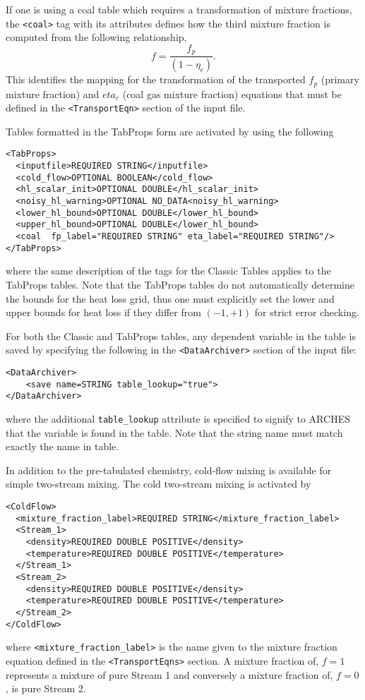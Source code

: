 If one is using a coal table which requires a transformation of mixture fractions, the \verb=<coal>= tag with its attributes defines how the third mixture fraction is computed from the following relationship, 
\begin{equation}
f = \frac{ f_p }{(1 - \eta_c) }.
\end{equation}   
This identifies the mapping for the transformation of the transported $f_p$ (primary mixture fraction) and  $eta_c$ (coal gas mixture fraction) equations that must be defined in the \verb=<TransportEqn>= section of the input file.  

Tables formatted in the TabProps form are activated by using the following
%
\begin{Verbatim}[fontsize=\footnotesize]
<TabProps>
  <inputfile>REQUIRED STRING</inputfile> 
  <cold_flow>OPTIONAL BOOLEAN</cold_flow>
  <hl_scalar_init>OPTIONAL DOUBLE</hl_scalar_init> 
  <noisy_hl_warning>OPTIONAL NO_DATA<noisy_hl_warning> 
  <lower_hl_bound>OPTIONAL DOUBLE</lower_hl_bound>
  <upper_hl_bound>OPTIONAL DOUBLE</lower_hl_bound>
  <coal  fp_label="REQUIRED STRING" eta_label="REQUIRED STRING"/> 
</TabProps>
\end{Verbatim}
%
where the same description of the tags for the Classic Tables applies to the TabProps tables.  Note that the TabProps tables do not automatically determine the bounds for the heat loss grid, thus one must explicitly set the lower and upper bounds for heat loss if they differ from $(-1, +1)$ for strict error checking.  

For both the Classic and TabProps tables, any dependent variable in the table is saved by specifying the following in the \verb=<DataArchiver>= section of the input file: 
%
\begin{Verbatim}[fontsize=\footnotesize]
<DataArchiver>
    <save name=STRING table_lookup="true"> 
</DataArchiver>
\end{Verbatim} 
%
where the additional \verb=table_lookup= attribute is specified to signify to ARCHES that the variable is found in the table.  Note that the string name must match exactly the name in table.  

In addition to the pre-tabulated chemistry, cold-flow mixing is available for simple two-stream mixing.  The cold two-stream mixing is activated by
%
\begin{Verbatim}[fontsize=\footnotesize]
<ColdFlow>
  <mixture_fraction_label>REQUIRED STRING</mixture_fraction_label>
  <Stream_1>
    <density>REQUIRED DOUBLE POSITIVE</density>
    <temperature>REQUIRED DOUBLE POSITIVE</temperature>
  </Stream_1>
  <Stream_2>
    <density>REQUIRED DOUBLE POSITIVE</density>
    <temperature>REQUIRED DOUBLE POSITIVE</temperature>
  </Stream_2>
</ColdFlow>
\end{Verbatim}
% 
where \verb=<mixture_fraction_label>= is the name given to the mixture fraction equation defined in the \verb=<TransportEqns>= section.  A mixture fraction of, $f=1$ represents a mixture of pure Stream 1 and conversely a mixture fraction of, $f=0$, is pure Stream 2.  

